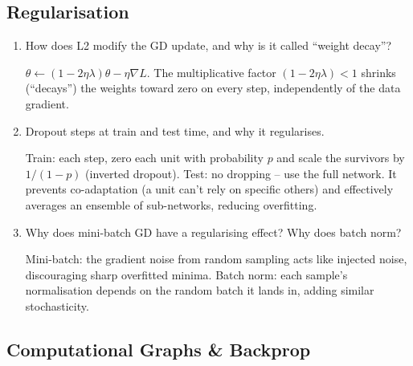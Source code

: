 \documentclass[10pt,a4paper]{article}
\newcommand{\q}[1]{\item #1}
\begin{document}
\subsection{Regularisation}

\begin{enumerate}[leftmargin=*,label=\textbf{Q\arabic*.}]

\q How does L2 modify the GD update, and why is it called ``weight decay''?
\begin{answerbox}
$\theta \leftarrow (1-2\eta\lambda)\theta - \eta\nabla L$. The multiplicative factor $(1-2\eta\lambda)<1$ shrinks (``decays'') the weights toward zero on every step, independently of the data gradient.
\end{answerbox}

\q Dropout steps at train and test time, and why it regularises.
\begin{answerbox}
Train: each step, zero each unit with probability $p$ and scale the survivors by $1/(1-p)$ (inverted dropout). Test: no dropping -- use the full network. It prevents co-adaptation (a unit can't rely on specific others) and effectively averages an ensemble of sub-networks, reducing overfitting.
\end{answerbox}

\q Why does mini-batch GD have a regularising effect? Why does batch norm?
\begin{answerbox}
Mini-batch: the gradient noise from random sampling acts like injected noise, discouraging sharp overfitted minima. Batch norm: each sample's normalisation depends on the random batch it lands in, adding similar stochasticity.
\end{answerbox}

\end{enumerate}

\subsection{Computational Graphs \& Backprop}
\end{document}
